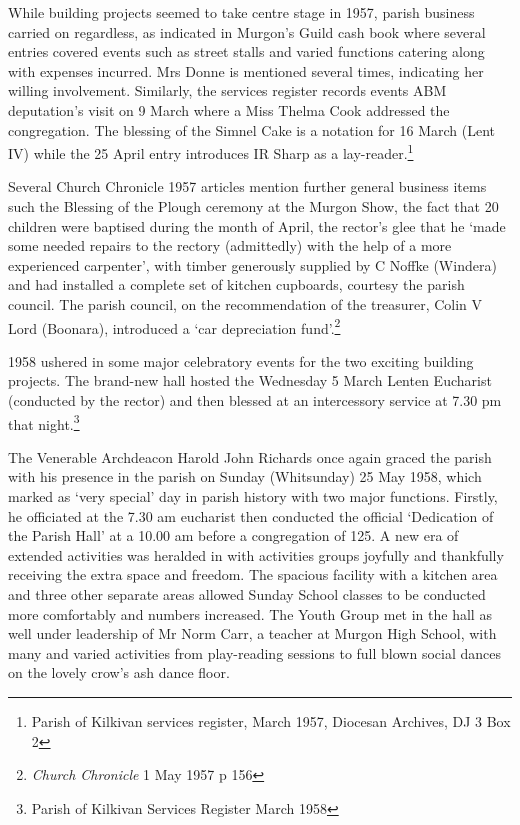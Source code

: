While building projects seemed to take centre stage in 1957, parish business carried on regardless, as indicated in Murgon's Guild cash book where several entries covered events such as street stalls and varied functions catering along with expenses incurred. Mrs Donne is mentioned several times, indicating her willing involvement. Similarly, the services register records events ABM deputation's visit on 9 March where a Miss Thelma Cook addressed the congregation. The blessing of the Simnel Cake is a notation for 16 March (Lent IV) while the 25 April entry introduces IR Sharp as a lay-reader.\footnote{Parish of Kilkivan services register, March 1957, Diocesan Archives, DJ 3 Box 2}


Several Church Chronicle 1957 articles mention further general business items such the Blessing of the Plough ceremony at the Murgon Show, the fact that 20 children were baptised during the month of April, the rector's glee that he `made some needed repairs to the rectory (admittedly) with the help of a more experienced carpenter', with timber generously supplied by C Noffke (Windera) and had installed a complete set of kitchen cupboards, courtesy the parish council. The parish council, on the recommendation of the treasurer, Colin V Lord (Boonara), introduced a `car depreciation fund'.\footnote{\emph{Church Chronicle} 1 May 1957 p 156}


1958 ushered in some major celebratory events for the two exciting building projects. The brand-new hall hosted the Wednesday 5 March Lenten Eucharist (conducted by the rector) and then blessed at an intercessory service at 7.30 pm that night.\footnote{Parish of Kilkivan Services Register March 1958}


The Venerable Archdeacon Harold John Richards once again graced the parish with his presence in the parish on Sunday (Whitsunday) 25 May 1958, which marked as `very special' day in parish history with two major functions. Firstly, he officiated at the 7.30 am eucharist then conducted the official `Dedication of the Parish Hall' at a 10.00 am before a congregation of 125. A new era of extended activities was heralded in with activities groups joyfully and thankfully receiving the extra space and freedom. The spacious facility with a kitchen area and three other separate areas allowed Sunday School classes to be conducted more comfortably and numbers increased. The Youth Group met in the hall as well under leadership of Mr Norm Carr, a teacher at Murgon High School, with many and varied activities from play-reading sessions to full blown social dances on the lovely crow's ash dance floor.



